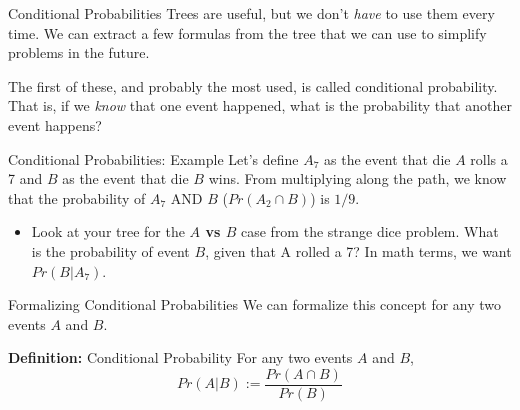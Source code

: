 \documentclass{beamer}
\begin{document}
\begin{frame}{Conditional Probabilities}
    Trees are useful, but we don't \textit{have} to use them every time. We can extract a few formulas from the tree that we can use to simplify problems in the future. \vspace{2mm}
    
    The first of these, and probably the most used, is called \alert{conditional probability}. That is, if we \textit{know} that one event happened, what is the probability that another event happens? \vspace{2mm}
\end{frame}

\begin{frame}{Conditional Probabilities: Example}
    Let's define $A_7$ as the event that die $A$ rolls a 7 and $B$ as the event that die $B$ wins. From multiplying along the path, we know that the probability of $A_7$ AND $B$ ($Pr(A_2 \cap B)$) is $1/9$.
    
    
    \begin{itemize}
        \item Look at your tree for the \textbf{$A$ vs $B$} case from the strange dice problem. What is the probability of event $B$, \alert{given} that A rolled a 7? In math terms, we want $Pr(B|A_7)$. 
         
    \end{itemize}
\end{frame}

\begin{frame}{Formalizing Conditional Probabilities}
    We can formalize this concept for any two events $A$ and $B$. \vspace{2mm}
    
    \textbf{Definition:} Conditional Probability \newline
    For any two events $A$ and $B$, 
    \[ Pr(A|B) := \frac{Pr(A \cap B)}{Pr(B)}\]
    
\end{frame}
\end{document}
